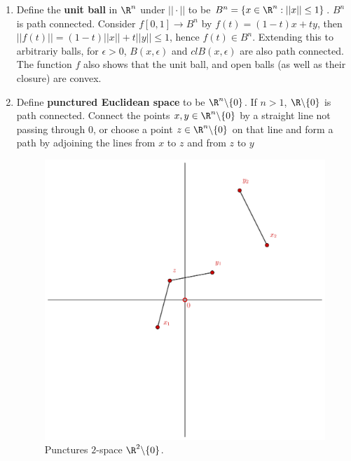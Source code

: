 \begin{example}
    \begin{enumerate}[label=(\arabic*)]
        \item Define the \textbf{unit ball} in $\R^n$ under  $||\cdot||$ to be  $B^n=\{x \in
            \R^n:||x|| \leq 1\}$. $B^n$ is path connected. Consider  $f[0,1] \rightarrow B^n$ by
            $f(t)=(1-t)x+ty$, then $||f(t)||=(1-t)||x||+t||y|| \leq 1$, hence $f(t) \in  B^n$.
            Extending this to arbitrariy balls, for $\epsilon>0$, $B(x,\epsilon)$ and
            $cl{B(x,\epsilon)}$ are also path connected. The function $f$ also shows that the unit
            ball, and open balls  (as well as their closure) are convex.

        \item Define \textbf{punctured Euclidean space} to be $\com{\R^n}{\{0\}}$. If $n>1$,
        $\com{\R}{\{0\}}$ is path connected. Connect the points $x,y \in \com{\R^n}{\{0\}}$ by a
        straight line not passing through $0$, or choose a point $z \in \com{\R^n}{\{0\}}$ on that
        line and form a path by adjoining the lines from $x$ to  $z$ and from  $z$ to  $y$

        \begin{figure}[h] 
            \centering
            \includegraphics[scale=0.2]{Figures/Chapter3/puncturedSpace.eps}
            \caption{Punctures $2$-space $\com{\R^2}{\{0\}}$.}
            \label{fig_3.1}
        \end{figure}


\end{enumerate}
\end{example}
